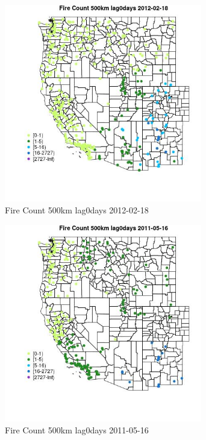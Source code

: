 \begin{figure} 
\centering  
\includegraphics[width=0.77\textwidth]{Code_Outputs/Report_ML_input_PM25_Step4_part_f_de_duplicated_aveswNAs_MapObsFire_Count_500km_lag0days2012-02-18.jpg} 
\caption{\label{fig:Report_ML_input_PM25_Step4_part_f_de_duplicated_aveswNAsMapObsFire_Count_500km_lag0days2012-02-18}Fire Count 500km lag0days 2012-02-18} 
\end{figure} 
 

\begin{figure} 
\centering  
\includegraphics[width=0.77\textwidth]{Code_Outputs/Report_ML_input_PM25_Step4_part_f_de_duplicated_aveswNAs_MapObsFire_Count_500km_lag0days2011-05-16.jpg} 
\caption{\label{fig:Report_ML_input_PM25_Step4_part_f_de_duplicated_aveswNAsMapObsFire_Count_500km_lag0days2011-05-16}Fire Count 500km lag0days 2011-05-16} 
\end{figure} 
 

